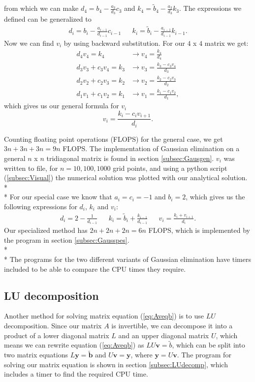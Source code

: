 \documentclass[norsk,a4paper,12pt]{article}
\begin{document}
from which we can make $d_4=b_4-\frac{a_3}{d_3}c_3$ and $k_4 = \tilde{b}_4-\frac{a_3}{d_3}k_3$. The expressions we defined can be generalized to \begin{align*}
d_i=b_i-\frac{a_{i-1}}{d_{i-1}}c_{i-1} && k_i=\tilde{b}_i-\frac{a_{i-1}}{d_{i-1}}k_{i-1}.
\end{align*}
Now we can find $v_i$ by using backward substitution. For our $4$ x $4$ matrix we get:
\begin{align*}
d_4v_4=k_4 &\rightarrow v_4 = \frac{k_4}{d_4} \\
d_3v_3+c_3v_4 = k_3 &\rightarrow v_3=\frac{k_3-c_3v_4}{d_3} \\
d_2v_2+c_2v_3 = k_2 &\rightarrow v_2=\frac{k_2-c_2v_3}{d_2} \\
d_1v_1+c_1v_2 = k_1 &\rightarrow v_1=\frac{k_1-c_1v_2}{d_1},
\end{align*}
which gives us our general formula for $v_i$
$$v_i=\frac{k_i-c_iv_{i+1}}{d_i}.$$

Counting floating point operations (FLOPS) for the general case, we get $3n+3n+3n=9n$ FLOPS. The implementation of Gaussian elimination on a general $n$ x $n$ tridiagonal matrix is found in section \ref{subsec:Gausgen}. $v_i$ was written to file, for $n=10,100,1000$ grid points, and using a python script (\ref{subsec:Visual}) the numerical solution was plotted with our analytical solution. 
\\* \\* \noindent
For our special case we know that $a_i=c_i=-1$ and $b_i=2$, which gives us the following expressions for $d_i$, $k_i$ and $v_i$:
\begin{align*}
d_i = 2-\frac{1}{d_{i-1}} && k_i = \tilde{b}_i + \frac{k_{i-1}}{d_{i-1}} && v_i = \frac{k_i+v_{i+1}}{d_i}.
\end{align*}
Our specialized method has $2n+2n+2n=6n$ FLOPS, which is implemented by the program in section \ref{subsec:Gausspes}.
\\* \\* \noindent
The programs for the two different variants of Gaussian elimination have timers included to be able to compare the CPU times they require.


\subsection{LU decomposition}
Another method for solving matrix equation (\ref{eq:Aveqb}) is to use $LU$ decomposition. Since our matrix $A$ is invertible, we can decompose it into a product of a lower diagonal matrix $L$ and an upper diagonal matrix $U$, which means we can rewrite equation (\ref{eq:Aveqb}) as $LU\textbf{v} = \tilde{b}$, which can be split into two matrix equations $L\textbf{y} = \tilde{\textbf{b}}$ and $U\textbf{v} = \textbf{y}$, where $\textbf{y} = U\textbf{v}$. The program for solving our matrix equation is shown in section \ref{subsec:LUdecomp}, which includes a timer to find the required CPU time.
\end{document}
